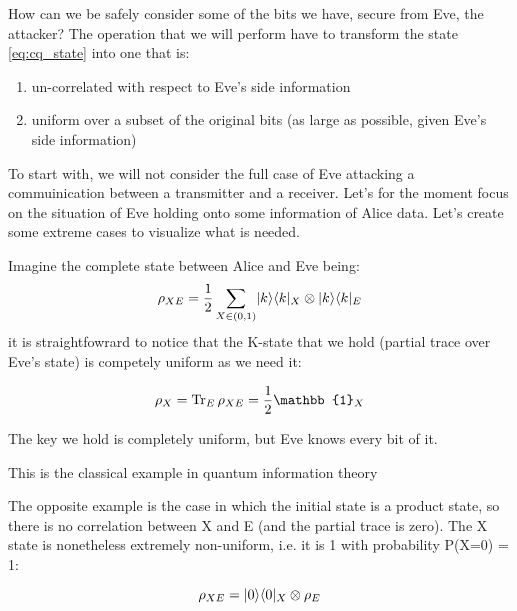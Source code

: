 How can we be safely consider some of the bits we have, secure from Eve, the attacker? The operation that we will perform have to transform the state \ref{eq:cq_state} into one that is:
\begin{enumerate}
	\item un-correlated with respect to  Eve's side information
	\item uniform over a subset of the original bits (as large as possible, given Eve's side information)
\end{enumerate}
To start with, we will not consider the full case of Eve attacking a commuinication between a transmitter and a receiver. Let's for the moment focus on the situation of Eve holding onto some information of Alice data.
Let's create some extreme cases to visualize what is needed.

\begin{example}
	Imagine the complete state between Alice and Eve being:
	\begin{equation}
		\rho_{XE}= \frac{1}{2} \sum_{X \in (0,1)} \lvert k\rangle\langle k\rvert_X \otimes \lvert k\rangle\langle k\rvert_E
		\label{eq:Eveknowseverything}
	\end{equation}
	it is straightfowrard to notice that the K-state that we hold (partial trace over Eve's state) is competely uniform as we need it:

	\begin{equation}
		\rho_X = \Tr_E \rho_{XE} = \frac{1}{2} \mathbb{1}_X
	\end{equation}

	The key we hold is completely uniform, but Eve knows every bit of it.
\end{example}

\begin{example}
	This is the classical example in quantum information theory
\end{example}

\begin{example}
	The opposite example is the case in which the initial state is a product state, so there is no correlation between X and E (and the partial trace is zero). The X state is nonetheless extremely non-uniform, i.e. it is 1 with probability P(X=0) = 1:

	\begin{equation}
		\rho_{XE}= \lvert0\rangle\langle0\rvert_X \otimes \rho_E
	\end{equation}
\end{example}

